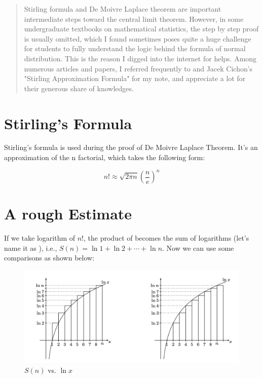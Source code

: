 \documentclass[11pt]{article}
\begin{document}
\begin{abstract}
Stirling formula and De Moivre Laplace theorem are important intermediate steps toward the central limit theorem.  However,  in some undergraduate textbooks on mathematical statistics,  the step by step proof is usually omitted,  which I found sometimes poses quite a huge challenge for students to fully understand the logic behind the formula of normal distribution.  This is the reason I digged into the internet for helps.  Among numerous articles and papers, I referred frequently to \cite{balazs2014stirling} and Jacek Cichon's "Stirling Approximation Formula" for my note,  and appreciate a lot for their generous share of knowledges.
\end{abstract}



\setcounter{figure}{0}

\vspace{10pt}


\section {\large Stirling's Formula}


Stirling's formula is used during the proof of De Moivre Laplace Theorem.  It's an approximation of the n factorial,  which takes the following form:

\begin{tcolorbox} 
[colback=blue!5!white,  colframe=blue!75!black,  title= {\textbf{
Stirling's Formula
} }]

$$ n! \approx \sqrt{ 2 \pi n} \left(  \frac{n}{e} \right) ^n $$

\end{tcolorbox}


\section {\large A rough Estimate}

If we take  logarithm of $n!$,  the product of  becomes the sum of logarithms (let's name it as  ),  i.e.,  $ S(n) = \ln 1 + \ln 2 + \cdots + \ln n$.   Now we can use some comparisons as shown below:

\begin{figure}[H] 
\includegraphics [scale = 0.6] {comparison} %
\centering
\caption{$S(n)$ vs.  $\ln x$ }
\label{fig:f1}
\end{figure}
\end{document}
